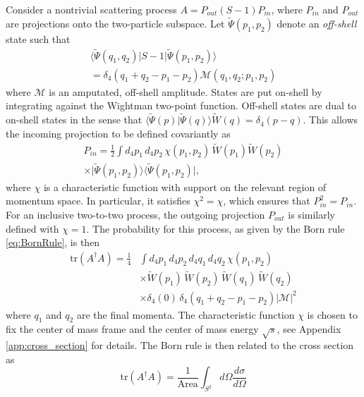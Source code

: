\documentclass[pra,aps,amsmath,amssymb,notitlepage, twocolumn,superscriptaddress,longbibliography,nofootinbib,floatfix,10pt]{revtex4-2}
\begin{document}
Consider a nontrivial scattering process $A= P_{out} (S-1) P_{in}$, where $P_{in}$ and $P_{out}$ are projections onto the two-particle subspace. Let $\tilde{\Psi}(p_1,p_2)$ denote an {\it off-shell} state such that
\begin{multline}
     \langle\tilde{\Psi}(q_1,q_2)|S-1|\tilde{\Psi}(p_1,p_2)\rangle \\
     = \delta_4(q_1\!+\!q_2\!-\!p_1\!-\!p_2)\mathcal{M}(q_1,q_2;p_1,p_2)
\end{multline}
where $\mathcal{M}$ is an amputated, off-shell amplitude. States are put on-shell by integrating against the Wightman two-point function. Off-shell states are dual to on-shell states in the sense that $\langle\tilde{\Psi}(p)|\tilde{\Psi}(q)\rangle\tilde{W}(q)=\delta_4(p-q)$. This allows the incoming projection to be defined covariantly as
\begin{multline}\label{eq:P_in}
    P_{in} = \frac12 \int d_4p_1\,d_4p_2\,\chi(p_1,p_2)\,\tilde{W}(p_1)\tilde{W}(p_2) \\
    \times \bigl| \tilde{\Psi}(p_1,p_2)\bigr\rangle \bigl\langle \tilde{\Psi}(p_1,p_2)\bigr|,
\end{multline}
where $\chi$ is a characteristic function with support on the relevant region of momentum space. In particular, it satisfies $\chi^2=\chi$, which ensures that $P_{in}^2=P_{in}$. For an inclusive two-to-two process, the outgoing projection $P_{out}$ is similarly defined with $\chi=1$. The probability for this process, as given by the Born rule \eqref{eq:BornRule}, is then
\begin{align}\label{eq:un-evaluated_Born_rule}
    \text{tr}\left( A^\dagger A \right) = \frac14 & \int d_4p_1\,d_4p_2\,d_4q_1\,d_4q_2\, \chi(p_1,p_2) \nonumber\\
    &\times \tilde{W}(p_1)\, \tilde{W}(p_2)\, \tilde{W}(q_1)\, \tilde{W}(q_2) \\
	&\times \delta_4(0)\, \delta_4(q_1\!+\!q_2\!-\!p_1\!-\!p_2) \left|\mathcal{M}\right|^2\nonumber
\end{align}
where $q_1$ and $q_2$ are the final momenta. The characteristic function $\chi$ is chosen to fix the center of mass frame and the center of mass energy $\sqrt{s}$, see Appendix \ref{app:cross_section} for details. The Born rule is then related to the cross section as
\begin{equation}\label{eq:cross_section_from_trace}
    \text{tr}\left( A^\dagger A \right) = \frac1{\text{Area}}\int_{S^2}d\Omega\frac{d\sigma}{d\Omega}
\end{equation}
\end{document}
